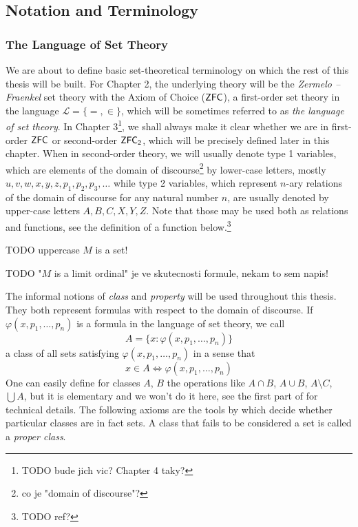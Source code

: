 \subsection{Notation and Terminology}
\subsubsection{The Language of Set Theory}

We are about to define basic set-theoretical terminology on which the rest of this thesis will be built. For Chapter 2, the underlying theory will be the \emph{Zermelo –Fraenkel} set theory with the Axiom of Choice ($\sf{ZFC}$), a first-order set theory in the language $\mathscr{L} = \{=, \in\}$, which will be sometimes referred to as \emph{the language of set theory}. In Chapter 3\footnote{TODO bude jich vic? Chapter 4 taky?}, we shall always make it clear whether we are in first-order $\sf{ZFC}$ or second-order $\sf{ZFC}_2$, which will be precisely defined later in this chapter. When in second-order theory, we will usually denote type 1 variables, which are elements of the domain of discourse\footnote{co je "domain of discourse"?} by lower-case letters, mostly $u, v, w, x, y, z, p_1, p_2, p_3,  \ldots$ while type 2 variables, which represent $n$-ary relations of the domain of discourse for any natural number $n$, are usually denoted by upper-case letters $A, B, C, X, Y, Z$. Note that those may be used both as relations and functions, see the definition of a function below.\footnote{TODO ref?}

TODO uppercase $M$ is a set!

TODO "$M$ is a limit ordinal" je ve skutecnosti formule, nekam to sem napis!

The informal notions of \emph{class} and \emph{property} will be used throughout this thesis. They both represent formulas with respect to the domain of discourse. If $\varphi(x, p_1, \ldots, p_n)$ is a formula in the language of set theory, we call 
\begin{equation}
A = \{x : \varphi(x, p_1, \ldots, p_n)\}
\end{equation}
a class of all sets satisfying $\varphi(x, p_1, \ldots, p_n)$ in a sense that 
\begin{equation}
x \in A \iff \varphi(x, p_1, \ldots, p_n)
\end{equation}
One can easily define for classes $A$, $B$ the operations like $A \cap B$, $A \cup B$, $A \setminus C$, $\bigcup A$, but it is elementary and we won't do it here, see the first part of \cite{JechBook} for technical details. The following axioms are the tools by which decide whether particular classes are in fact sets. A class that fails to be considered a set is called a \emph{proper class}.
\


